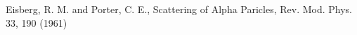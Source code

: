 \begin{thebibliography}{99.}%

 Eisberg, R. M. and Porter, C. E., Scattering of Alpha Paricles, Rev. Mod. Phys. 33, 190 (1961)

\end{thebibliography}
